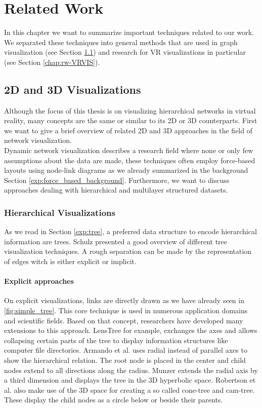 \chapter{Related Work}

In this chapter we want to summarize important techniques related to our work. We separated these techniques into general methods that are used in graph visualization (see Section \ref{chap:rw-2d3dLayout}) and research for VR visualizations in particular (see Section \ref{chap:rw-VRVIS}). 
\section{2D and 3D Visualizations}
\label{chap:rw-2d3dLayout}
Although the focus of this thesis is on visualizing hierarchical networks in virtual reality, many concepts are the same or similar to its 2D or 3D counterparts. First we want to give a brief overview of related 2D and 3D approaches in the field of network visualization.\\
Dynamic network visualization describes a research field where none or only few assumptions about the data are made, these techniques often employ force-based layouts using node-link diagrams as we already summarized in the background Section \ref{exp:force_based_background}. Furthermore, we want to discuss approaches dealing with hierarchical and multilayer structured datasets.

\subsection{Hierarchical Visualizations}

As we read in Section \ref{exp:tree}, a preferred data structure to encode hierarchical information are trees.
Schulz \cite{schulz_treevisnet_2011} presented a good overview of different tree visualization techniques. A rough separation can be made by the representation of edges witch is either explicit or implicit. 

\subsubsection{Explicit approaches}
On explicit visualizations, links are directly drawn as we have already seen in \ref{fig:simple_tree}. This core technique is used in numerous application domains and scientific fields. Based on that concept, researchers have developed many extensions to this approach.
LensTree \cite{song_lenstree_2006} for example, exchanges the axes and allows collapsing certain parts of the tree to display information structures like computer file directories. 
Armando et al. \cite{arce-orozco_radial_2017} uses radial instead of parallel axes to show the hierarchical relation. The root node is placed in the center and child nodes extend to all directions along the radius.
Munzer \cite{munzner_h3_1997} extends the radial axis by a third dimension and displays the tree in the 3D hyperbolic space.
Robertson et al. \cite{robertson_cone_1991} also make use of the 3D space for creating a so called cone-tree and cam-tree. These display the child nodes as a circle below or beside their parents.  

